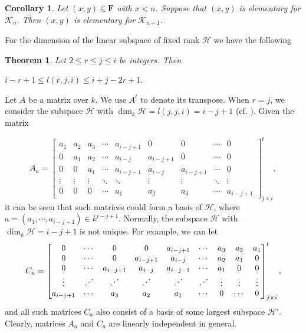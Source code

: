 \documentclass[a4paper,12pt]{amsart}
\newcommand{\cH}{\mathcal{H}}
\newcommand{\cK}{\mathcal{K}}
\newcommand{\revddots}{\reflectbox{$\ddots$}}
\newtheorem{Theorem}[proposition]{Theorem}
\newtheorem{corollary}[proposition]{Corollary}
\begin{document}
\begin{corollary}\label{coro}\cite[Corollary 3.11]{jie}
Let $(x,y)\in \mathbf{F}$ with $x<n$. Suppose that $(x,y)$ is elementary for $\cK_{n}$. Then $(x,y)$ is elementary for $\cK_{n+1}$.

\end{corollary}

For the dimension of the linear subspace of fixed rank $\cH$ we have the following

\begin{Theorem} \cite[Theorem]{West}\label{wt}
Let $2\leq r\leq j\leq i$ be integers. Then 

\begin{center}
$i-r+1\leq l(r,j,i)\leq i+j-2r+1$.
\end{center}


\end{Theorem}

Let $A$ be a matrix over $k$. We use $A^t$ to denote its transpose. When $r=j$,  we consider the subspace $\cH$  with $\dim_k\cH=l(j,j,i)=i-j+1$ (cf. \cite[Corollary I]{john}).  Given the matrix 

\[  A_a=\begin{bmatrix}
a_1 &a_2  & a_3&   \cdots & a_{i-j+1} & 0&  0 & \cdots & 0\\
0 & a_1 & a_2 & \cdots & a_{i-j} & a_{i-j+1} & 0 &\cdots & 0\\
0& 0& a_1 & \cdots & a_{i-j-1} & a_{i-j} & a_{i-j+1} & \cdots & 0\\
\vdots & \vdots & \vdots & \ddots & \ddots & \vdots & \vdots & \ddots & \vdots\\
0 & 0 & 0  & \cdots & a_1 & a_2 & a_3 & \cdots & a_{i-j+1} 
\end{bmatrix}^t_{j\times i}, \]
it can be seen that such matrices could form a basis of $\cH$, where $a=(a_1,\cdots, a_{i-j+1})\in k^{i-j+1}$. Normally, the  subspace $\cH$ with $\dim_k \cH=i-j+1$ is not unique. For example, we can let 
 \[ C_a=\begin{bmatrix}
 0 & \cdots & 0  & 0 & a_{i-j+1} & \cdots & a_3 & a_2 & a_1\\
  0 & \cdots & 0   & a_{i-j+1}  & a_{i-j} & \cdots & a_2 & a_1 & 0\\
0 & \cdots &  a_{i-j+1} &  a_{i-j}& a_{i-j-1} &\cdots  &a_1 & 0  & 0\\
\vdots & \revddots&\revddots & \revddots& \revddots &\revddots & \vdots & \vdots & \vdots\\
a_{i-j+1} & \cdots & a_3 & a_2 & a_1 & \cdots & 0& \cdots & 0
\end{bmatrix}^t_{j\times i}, \]
and  all such matrices $C_a$ also consist of a basis of some largest subspace $\cH'$. Clearly, matrices $A_a$ and $C_a$ are linearly independent in general.
\end{document}
